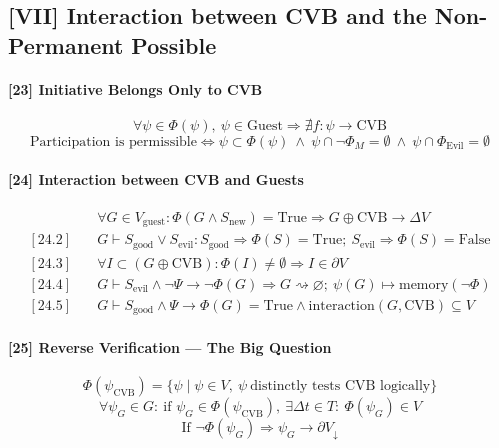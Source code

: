 \documentclass[12pt]{article}
\begin{document}
\subsection*{[VII] Interaction between CVB and the Non-Permanent Possible}

\paragraph{[23] Initiative Belongs Only to CVB}
\[
\forall \psi \in \Phi(\psi),\ \psi \in \text{Guest} \Rightarrow \nexists f : \psi \rightarrow \text{CVB}
\]
\[
\text{Participation is permissible} \Leftrightarrow \psi \subset \Phi(\psi)\ \wedge\ \psi \cap \neg \Phi_M = \emptyset\ \wedge\ \psi \cap \Phi_{\text{Evil}} = \emptyset
\]

\paragraph{[24] Interaction between CVB and Guests}
\begin{align*}
[24.1]\quad & \forall G \in V_{\text{guest}} : \Phi(G \land S_{\text{new}}) = \text{True} \Rightarrow G \oplus \text{CVB} \rightarrow \Delta V \\
[24.2]\quad & G \vdash S_{\text{good}} \lor S_{\text{evil}} : S_{\text{good}} \Rightarrow \Phi(S) = \text{True};\ S_{\text{evil}} \Rightarrow \Phi(S) = \text{False} \\
[24.3]\quad & \forall I \subset (G \oplus \text{CVB}) : \Phi(I) \neq \emptyset \Rightarrow I \in \partial V \\
[24.4]\quad & G \vdash S_{\text{evil}} \land \neg \Psi \rightarrow \neg \Phi(G) \Rightarrow G \rightsquigarrow \varnothing;\ \psi(G) \mapsto \text{memory}(\neg \Phi) \\
[24.5]\quad & G \vdash S_{\text{good}} \land \Psi \rightarrow \Phi(G) = \text{True} \land \text{interaction}(G, \text{CVB}) \subseteq V
\end{align*}

\paragraph{[25] Reverse Verification — The Big Question}
\[
\Phi(\psi_{\text{CVB}}) = \{ \psi \mid \psi \in V,\ \psi\ \text{distinctly tests CVB logically} \}
\]
\[
\forall \psi_G \in G:\ \text{if } \psi_G \in \Phi(\psi_{\text{CVB}}),\ \exists \Delta t \in T:\ \Phi(\psi_G) \in V
\]
\[
\text{If } \neg\Phi(\psi_G) \Rightarrow \psi_G \to \partial V_\downarrow
\]
\end{document}

